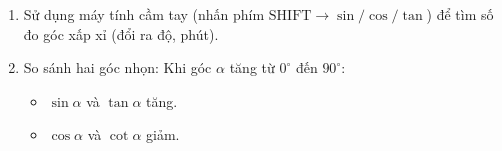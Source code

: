 \begin{enumerate}
\item Sử dụng máy tính cầm tay (nhấn phím $\text{SHIFT} \rightarrow \sin / \cos / \tan$) để tìm số đo góc xấp xỉ (đổi ra độ, phút).
\item So sánh hai góc nhọn: Khi góc $\alpha$ tăng từ $0^\circ$ đến $90^\circ$:
\begin{itemize}
\item $\sin \alpha$ và $\tan \alpha$ tăng.
\item $\cos \alpha$ và $\cot \alpha$ giảm.
\end{itemize}
\end{enumerate}
